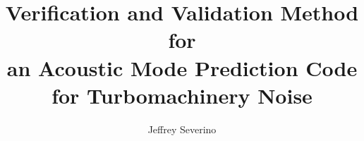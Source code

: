 \documentclass[12pt]{uthesis-v12}  %
\begin{document}

\title{ Verification and Validation Method for 
\protect\\an Acoustic Mode Prediction Code for Turbomachinery Noise}

\author{Jeffrey Severino} 


\end{document}
